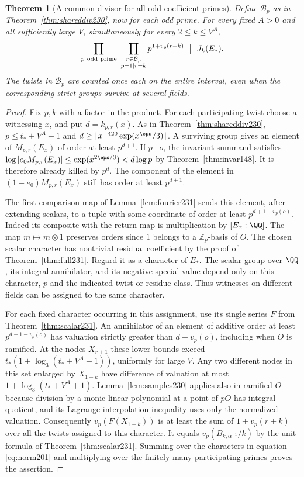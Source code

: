 \documentclass[a4paper,11pt]{article}
\newtheorem{theorem}[proposition]{Theorem}
\theoremstyle{definition}
\theoremstyle{remark}
\newcommand{\ZZ}{\mathbb Z}\newcommand{\ord}{\operatorname{ord}}
\numberwithin{equation}{section}
\begin{document}
\begin{theorem}[A common divisor for all odd coefficient primes]
\label{thm:div231}
Define \(\mathcal B_p\) as in Theorem~\ref{thm:shareddiv230}, now for
each odd prime. For every fixed \(A>0\) and all sufficiently large
\(V\), simultaneously for every \(2\le k\le V^A\),
\[
   \prod_{p\ {\rm odd\ prime}}
    \ \prod_{\substack{r\in\mathcal B_p\\p-1\mid r+k}}
                p^{1+v_p(r+k)}\ \bigm|\ J_k(E_*).
\]
The twists in \(\mathcal B_p\) are counted once each on the entire
interval, even when the corresponding strict groups survive at
several fields.
\end{theorem}
\begin{proof}
Fix \(p,k\) with a factor in the product. For each participating
twist choose a witnessing \(x\), and put \(d=k_{p,r}(x)\).
As in Theorem~\ref{thm:shareddiv230}, \(p\le t_*+V^A+1\) and
\(d\ge\lfloor x^{-420}\allowbreak\exp(x^\eps/3)\rfloor\). A surviving group
gives an element of \(M_{p,r}(E_x)\) of order at least \(p^{d+1}\).
If \(p\mid o\), the invariant summand satisfies
\(\log|e_0 M_{p,r}(E_x)|\le\exp(x^{2\eps/3})<d\log p\)
by Theorem~\ref{thm:invar148}. It is therefore already killed
by \(p^d\). The component of the element in \((1-e_0)M_{p,r}(E_x)\)
still has order at least \(p^{d+1}\).

The first comparison map of Lemma~\ref{lem:fourier231} sends this
element, after extending scalars, to a tuple with some coordinate
of order at least \(p^{d+1-v_p(o)}\). Indeed its composite with
the return map is multiplication by \([E_x:\QQ]\). The map
\(m\mapsto m\otimes1\) preserves orders since \(1\) belongs to
a \(\ZZ_p\)-basis of \(O\). The chosen scalar character has
nontrivial residual coefficient by the proof of
Theorem~\ref{thm:full231}. Regard it as a character of \(E_*\).
The scalar group over \(\QQ\), its integral annihilator, and its
negative special value depend only on this character, \(p\) and
the indicated twist or residue class. Thus witnesses on different
fields can be assigned to the same character.

For each fixed character occurring in this assignment, use its
single series \(F\) from Theorem~\ref{thm:scalar231}. An annihilator
of an element of additive order at least \(p^{d+1-v_p(o)}\)
has valuation strictly greater than \(d-v_p(o)\), including
when \(O\) is ramified. At the nodes \(X_{r+1}\) these lower
bounds exceed \(t_*(1+\log_3(t_*+V^A+1))\), uniformly for
large \(V\). Any two different nodes in this set enlarged by
\(X_{1-k}\) have difference of valuation at most
\(1+\log_3(t_*+V^A+1)\).
Lemma~\ref{lem:samples230} applies also in ramified \(O\) because
division by a monic linear polynomial at a point of \(pO\)
has integral quotient, and its Lagrange interpolation inequality
uses only the normalized valuation. Consequently \(v_p(F(X_{1-k}))\)
is at least the sum of \(1+v_p(r+k)\) over all the twists assigned
to this character. It equals \(v_p(B_{k,\alpha^{-1}}/k)\) by the
unit formula of Theorem~\ref{thm:scalar231}. Summing over the characters
in equation \eqref{eq:norm201} and multiplying over the
finitely many participating primes proves the assertion.
\end{proof}
\end{document}
